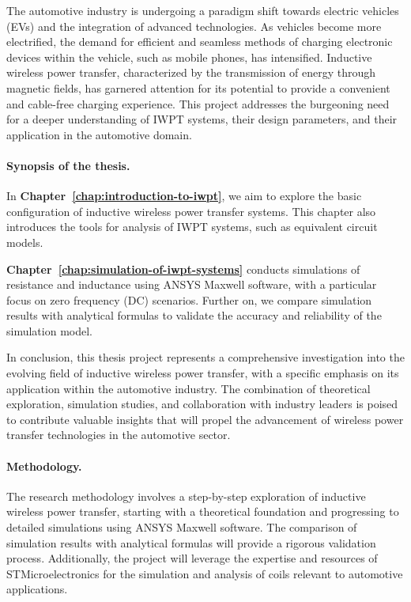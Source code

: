 \documentclass[11pt,a4paper,twoside,openany]{report}
\begin{document}
    The automotive industry is undergoing a paradigm shift towards electric vehicles (EVs) and the integration of advanced technologies. As vehicles become more electrified, the demand for efficient and seamless methods of charging electronic devices within the vehicle, such as mobile phones, has intensified. Inductive wireless power transfer, characterized by the transmission of energy through magnetic fields, has garnered attention for its potential to provide a convenient and cable-free charging experience. This project addresses the burgeoning need for a deeper understanding of IWPT systems, their design parameters, and their application in the automotive domain.

    \paragraph*{Synopsis of the thesis.} In \textbf{Chapter~\ref{chap:introduction-to-iwpt}}, we aim to explore the basic configuration of inductive wireless power transfer systems. This chapter also introduces the tools for analysis of IWPT systems, such as equivalent circuit models.

    \textbf{Chapter~\ref{chap:simulation-of-iwpt-systems}} conducts simulations of resistance and inductance using ANSYS Maxwell software, with a particular focus on zero frequency (DC) scenarios. Further on, we compare simulation results with analytical formulas to validate the accuracy and reliability of the simulation model.

    In conclusion, this thesis project represents a comprehensive investigation into the evolving field of inductive wireless power transfer, with a specific emphasis on its application within the automotive industry. The combination of theoretical exploration, simulation studies, and collaboration with industry leaders is poised to contribute valuable insights that will propel the advancement of wireless power transfer technologies in the automotive sector.

    \paragraph*{Methodology.} The research methodology involves a step-by-step exploration of inductive wireless power transfer, starting with a theoretical foundation and progressing to detailed simulations using ANSYS Maxwell software. The comparison of simulation results with analytical formulas will provide a rigorous validation process. Additionally, the project will leverage the expertise and resources of STMicroelectronics for the simulation and analysis of coils relevant to automotive applications.
\end{document}
